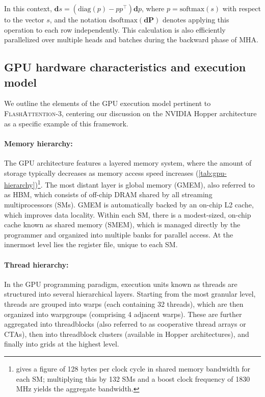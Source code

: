 \begin{enumerate}
In this context, $\mathbf{d}s = (\mathrm{diag}(p) - p p^\top)\mathbf{d}p$, where $p = \mathrm{softmax}(s)$ with respect to the vector $s$, and the notation $\mathrm{dsoftmax}(\mathbf{dP})$ denotes applying this operation to each row independently. This calculation is also efficiently parallelized over multiple heads and batches during the backward phase of MHA.

\subsection{GPU hardware characteristics and execution model}
\label{subsec:hardware}

We outline the elements of the GPU execution model pertinent to \textsc{FlashAttention-3}, centering our discussion on the NVIDIA Hopper architecture as a specific example of this framework.

\paragraph{Memory hierarchy:} The GPU architecture features a layered memory system, where the amount of storage typically decreases as memory access speed increases (\cref{tab:gpu-hierarchy})\footnote{\citet{luo2024benchmarking} gives a figure of 128 bytes per clock cycle in shared memory bandwidth for each SM; multiplying this by 132 SMs and a boost clock frequency of 1830 MHz yields the aggregate bandwidth.}. The most distant layer is global memory (GMEM), also referred to as HBM, which consists of off-chip DRAM shared by all streaming multiprocessors (SMs). GMEM is automatically backed by an on-chip L2 cache, which improves data locality. Within each SM, there is a modest-sized, on-chip cache known as shared memory (SMEM), which is managed directly by the programmer and organized into multiple banks for parallel access. At the innermost level lies the register file, unique to each SM.

\paragraph{Thread hierarchy:} In the GPU programming paradigm, execution units known as threads are structured into several hierarchical layers. Starting from the most granular level, threads are grouped into warps (each containing 32 threads), which are then organized into warpgroups (comprising 4 adjacent warps). These are further aggregated into threadblocks (also referred to as cooperative thread arrays or CTAs), then into threadblock clusters (available in Hopper architectures), and finally into grids at the highest level.


\end{enumerate}
